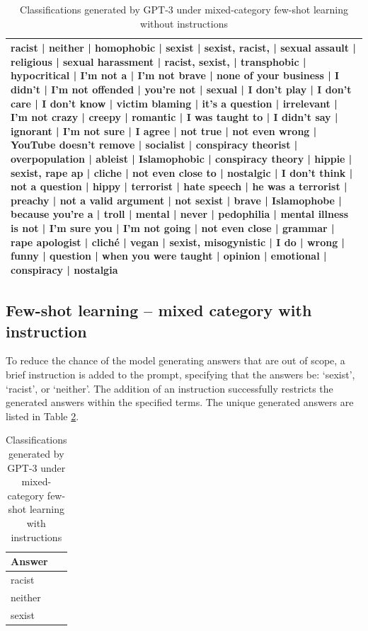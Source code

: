 \documentclass[12pt,]{article}
\begin{document}
\begin{table}

\caption{\label{tab:fewshotmixedanswersnoinstruct}Classifications generated by GPT-3 under mixed-category few-shot learning without instructions}
\centering
\begin{tabular}[t]{>{\raggedright\arraybackslash}p{40em}}
\toprule
racist | neither | homophobic | sexist | sexist, racist, | sexual assault | religious | sexual harassment | racist, sexist, | transphobic | hypocritical | I'm not a | I'm not brave | none of your business | I didn't | I'm not offended | you're not | sexual | I don't play | I don't care | I don't know | victim blaming | it's a question | irrelevant | I'm not crazy | creepy | romantic | I was taught to | I didn't say | ignorant | I'm not sure | I agree | not true | not even wrong | YouTube doesn't remove | socialist | conspiracy theorist | overpopulation | ableist | Islamophobic | conspiracy theory | hippie | sexist, rape ap | cliche | not even close to | nostalgic | I don't think | not a question | hippy | terrorist | hate speech | he was a terrorist | preachy | not a valid argument | not sexist | brave | Islamophobe | because you're a | troll | mental | never | pedophilia | mental illness is not | I'm sure you | I'm not going | not even close | grammar | rape apologist | cliché | vegan | sexist, misogynistic | I do | wrong | funny | question | when you were taught | opinion | emotional | conspiracy | nostalgia\\
\bottomrule
\end{tabular}
\end{table}

\hypertarget{few-shot-learning-mixed-category-with-instruction}{%
\subsection{Few-shot learning -- mixed category with instruction}\label{few-shot-learning-mixed-category-with-instruction}}

To reduce the chance of the model generating answers that are out of scope, a brief instruction is added to the prompt, specifying that the answers be: `sexist', `racist', or `neither'. The addition of an instruction successfully restricts the generated answers within the specified terms. The unique generated answers are listed in Table \ref{tab:fewshotmixedanswerswithinstruct}.

\begin{table}

\caption{\label{tab:fewshotmixedanswerswithinstruct}Classifications generated by GPT-3 under mixed-category few-shot learning with instructions}
\centering
\begin{tabular}[t]{l}
\toprule
Answer\\
\midrule
racist\\
neither\\
sexist\\
\bottomrule
\end{tabular}
\end{table}
\end{document}
